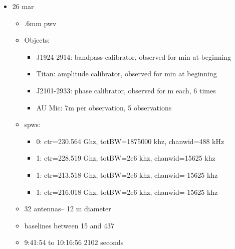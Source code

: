 \documentclass[a4paper]{tufte-handout}
\begin{document}
\begin{itemize}
	\item 26 mar
	      \begin{itemize}
	      	\item \abt .6mm pwv
	      	\item Objects:
	      	      \begin{itemize}
	      	      	\item J1924-2914: bandpass calibrator, observed for  min at beginning
	      	      	\item Titan: amplitude calibrator, observed for  min at beginning
	      	      	\item J2101-2933: phase calibrator, observed for  m each, 6 times
	      	      	\item AU Mic: \abt 7m per observation, 5 observations
	      	      \end{itemize}
	      	\item spws:
	      	      \begin{itemize}
	      	      	\item 0: ctr=230.564 Ghz, totBW=1875000 khz, chanwid=488 kHz
	      	      	\item 1: ctr=228.519 Ghz, totBW=2e6 khz, chanwid=15625 khz
	      	      	\item 1: ctr=213.518 Ghz, totBW=2e6 khz, chanwid=-15625 khz
	      	      	\item 1: ctr=216.018 Ghz, totBW=2e6 khz, chanwid=-15625 khz
	      	      \end{itemize}
	      	\item 32 antennas-- 12 m diameter
	      	\item baselines between 15 and 437
	      	\item 9:41:54 to 10:16:56 2102 seconds
	      \end{itemize}


\end{itemize}
\end{document}
